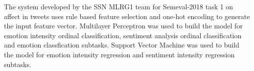 The system developed by the SSN MLRG1 team for Semeval-2018 task 1 on affect in tweets uses rule based feature selection and one-hot encoding to generate the input feature vector. Multilayer Perceptron was used to  build the model for emotion intensity ordinal  classification, sentiment analysis ordinal classification and emotion classfication subtasks. Support Vector Machine  was used to build the model for emotion intensity  regression and sentiment intensity regression subtasks.
